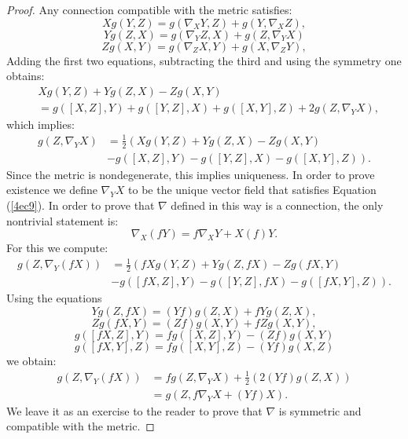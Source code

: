 \begin{proof}
	Any connection compatible with the metric satisfies:
	\[
	Xg\left(  Y,Z\right)  =g\left(  \nabla_{X}Y,Z\right)  +g\left(  Y,\nabla
	_{X}Z\right)  ,
	\]%
	\[
	Yg\left(  Z,X\right)  =g\left(  \nabla_{Y}Z,X\right)  +g\left(  Z,\nabla
	_{Y}X\right)
	\]
	\[
	Zg\left(  X,Y\right)  =g\left(  \nabla_{Z}X,Y\right)  +g\left(  X,\nabla
	_{Z}Y\right)  ,
	\]
	Adding the first two equations, subtracting the third and using the symmetry one obtains:
	\begin{align*}
	&  Xg\left(  Y,Z\right)  +Yg\left(  Z,X\right)  -Zg\left(  X,Y\right) \\
	&  =g\left(  \left[  X,Z\right]  ,Y\right)  +g\left(  \left[  Y,Z\right]
	,X\right)  +g\left(  \left[  X,Y\right]  ,Z\right)  +2g\left(  Z,\nabla
	_{Y}X\right)  ,
	\end{align*}
	which implies:
	\begin{align*}
	g\left(  Z,\nabla_{Y}X\right)   &  =\frac{1}{2}\left(  Xg\left(  Y,Z\right)
	+Yg\left(  Z,X\right)  -Zg\left(  X,Y\right)  \right. \\
	&  \left.  -g\left(  \left[  X,Z\right]  ,Y\right)  -g\left(  \left[
	Y,Z\right]  ,X\right)  -g\left(  \left[  X,Y\right]  ,Z\right)  \right)  .
	\end{align*}
	Since the metric is nondegenerate, this implies uniqueness.
	In order to prove existence we define  $\nabla_{Y}%
	X$
	to be the unique vector field that satisfies Equation (\ref{4ec9}). In order to prove that $\nabla$ defined in this way is a connection, the only nontrivial statement is:
	\[\nabla_X (fY)=f \nabla_X Y +X(f) Y.\]
	For this we compute:
	\begin{align*}
	g\left(  Z,\nabla_{Y}\left(  fX\right)  \right)   &  =\frac{1}{2}\left(
	fXg\left(  Y,Z\right)  +Yg\left(  Z,fX\right)  -Zg\left(  fX,Y\right)  \right.
	\\
	&  \left.  -g\left(  \left[  fX,Z\right]  ,Y\right)  -g\left(  \left[
	Y,Z\right]  ,fX\right)  -g\left(  \left[  fX,Y\right]  ,Z\right)  \right)  .
	\end{align*}
	Using the equations
	\[
	Yg\left(  Z,fX\right)  =\left(  Yf\right)  g\left(  Z,X\right)  +fYg\left(
	Z,X\right)  ,
	\]%
	\[
	Zg\left(  fX,Y\right)  =\left(  Zf\right)  g\left(  X,Y\right)  +fZg\left(
	X,Y\right)  ,
	\]%
	\[
	g\left(  \left[  fX,Z\right]  ,Y\right)  =fg\left(  \left[  X,Z\right]
	,Y\right)  -\left(  Zf\right)  g\left(  X,Y\right)
	\]
	\[
	g\left(  \left[  fX,Y\right]  ,Z\right)  =fg\left(  \left[  X,Y\right]
	,Z\right)  -\left(  Yf\right)  g\left(  X,Z\right)
	\]
	we obtain:
	\begin{align*}
	g\left(  Z,\nabla_{Y}\left(  fX\right)  \right)   &  =fg\left(  Z,\nabla
	_{Y}X\right)  +\frac{1}{2}\left(  2\left(  Yf\right)  g\left(  Z,X\right)
	\right) \\
	&  =g\left(  Z,f\nabla_{Y}X+\left(  Yf\right)  X\right)  .
	\end{align*}
	We leave it as an exercise to the reader to prove that $\nabla$ is symmetric and compatible with the metric.
\end{proof}


